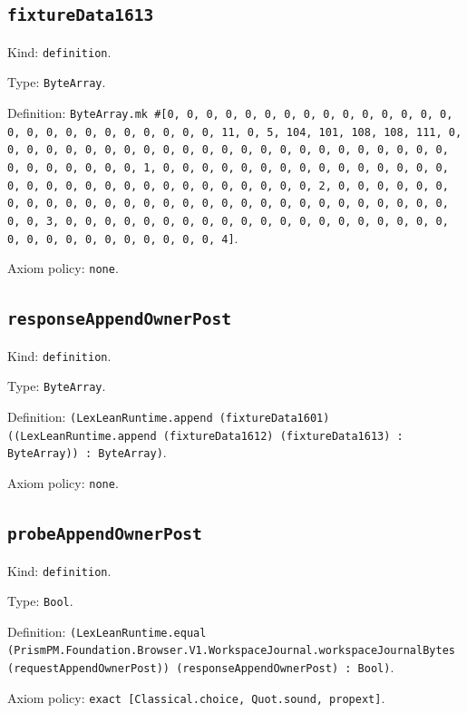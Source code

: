 \documentclass[11pt]{article}
\begin{document}
\subsection*{\texttt{fixtureData1613}}
\noindent Kind: \texttt{definition}.\par
\noindent Type: \texttt{ByteArray}.\par
\noindent Definition: \texttt{ByteArray.mk \#[0, 0, 0, 0, 0, 0, 0, 0, 0, 0, 0, 0, 0, 0, 0, 0, 0, 0, 0, 0, 0, 0, 0, 0, 0, 0, 11, 0, 5, 104, 101, 108, 108, 111, 0, 0, 0, 0, 0, 0, 0, 0, 0, 0, 0, 0, 0, 0, 0, 0, 0, 0, 0, 0, 0, 0, 0, 0, 0, 0, 0, 0, 0, 0, 0, 1, 0, 0, 0, 0, 0, 0, 0, 0, 0, 0, 0, 0, 0, 0, 0, 0, 0, 0, 0, 0, 0, 0, 0, 0, 0, 0, 0, 0, 0, 0, 0, 2, 0, 0, 0, 0, 0, 0, 0, 0, 0, 0, 0, 0, 0, 0, 0, 0, 0, 0, 0, 0, 0, 0, 0, 0, 0, 0, 0, 0, 0, 0, 0, 3, 0, 0, 0, 0, 0, 0, 0, 0, 0, 0, 0, 0, 0, 0, 0, 0, 0, 0, 0, 0, 0, 0, 0, 0, 0, 0, 0, 0, 0, 0, 0, 4]}.\par
\noindent Axiom policy: \texttt{none}.\par
\subsection*{\texttt{responseAppendOwnerPost}}
\noindent Kind: \texttt{definition}.\par
\noindent Type: \texttt{ByteArray}.\par
\noindent Definition: \texttt{(LexLeanRuntime.append (fixtureData1601) ((LexLeanRuntime.append (fixtureData1612) (fixtureData1613) : ByteArray)) : ByteArray)}.\par
\noindent Axiom policy: \texttt{none}.\par
\subsection*{\texttt{probeAppendOwnerPost}}
\noindent Kind: \texttt{definition}.\par
\noindent Type: \texttt{Bool}.\par
\noindent Definition: \texttt{(LexLeanRuntime.equal (PrismPM.Foundation.Browser.V1.WorkspaceJournal.workspaceJournalBytes (requestAppendOwnerPost)) (responseAppendOwnerPost) : Bool)}.\par
\noindent Axiom policy: \texttt{exact [Classical.choice, Quot.sound, propext]}.\par
\end{document}
